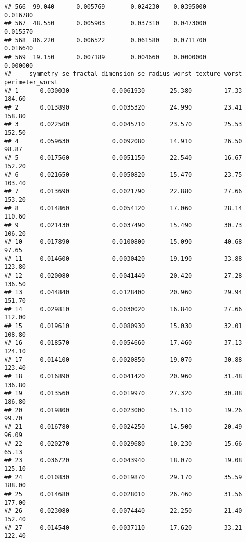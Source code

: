 \documentclass[
]{article}
\begin{document}
\begin{verbatim}
## 566  99.040      0.005769       0.024230    0.0395000          0.016780
## 567  48.550      0.005903       0.037310    0.0473000          0.015570
## 568  86.220      0.006522       0.061580    0.0711700          0.016640
## 569  19.150      0.007189       0.004660    0.0000000          0.000000
##     symmetry_se fractal_dimension_se radius_worst texture_worst perimeter_worst
## 1      0.030030            0.0061930       25.380         17.33          184.60
## 2      0.013890            0.0035320       24.990         23.41          158.80
## 3      0.022500            0.0045710       23.570         25.53          152.50
## 4      0.059630            0.0092080       14.910         26.50           98.87
## 5      0.017560            0.0051150       22.540         16.67          152.20
## 6      0.021650            0.0050820       15.470         23.75          103.40
## 7      0.013690            0.0021790       22.880         27.66          153.20
## 8      0.014860            0.0054120       17.060         28.14          110.60
## 9      0.021430            0.0037490       15.490         30.73          106.20
## 10     0.017890            0.0100800       15.090         40.68           97.65
## 11     0.014600            0.0030420       19.190         33.88          123.80
## 12     0.020080            0.0041440       20.420         27.28          136.50
## 13     0.044840            0.0128400       20.960         29.94          151.70
## 14     0.029810            0.0030020       16.840         27.66          112.00
## 15     0.019610            0.0080930       15.030         32.01          108.80
## 16     0.018570            0.0054660       17.460         37.13          124.10
## 17     0.014100            0.0020850       19.070         30.88          123.40
## 18     0.016890            0.0041420       20.960         31.48          136.80
## 19     0.013560            0.0019970       27.320         30.88          186.80
## 20     0.019800            0.0023000       15.110         19.26           99.70
## 21     0.016780            0.0024250       14.500         20.49           96.09
## 22     0.020270            0.0029680       10.230         15.66           65.13
## 23     0.036720            0.0043940       18.070         19.08          125.10
## 24     0.010830            0.0019870       29.170         35.59          188.00
## 25     0.014680            0.0028010       26.460         31.56          177.00
## 26     0.023080            0.0074440       22.250         21.40          152.40
## 27     0.014540            0.0037110       17.620         33.21          122.40

\end{verbatim}
\end{document}
